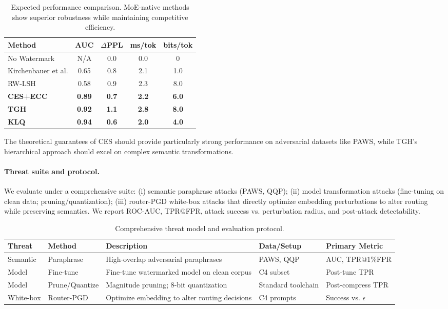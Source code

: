 \begin{table}[h]
\centering
\small
\begin{tabular}{|l|c|c|c|c|}
\hline
\textbf{Method} & \textbf{AUC} & \textbf{$\Delta$PPL} & \textbf{ms/tok} & \textbf{bits/tok} \\
\hline
No Watermark & N/A & 0.0 & 0.0 & 0 \\
Kirchenbauer et al. & 0.65 & 0.8 & 2.1 & 1.0 \\
RW-LSH & 0.58 & 0.9 & 2.3 & 8.0 \\
\textbf{CES+ECC} & \textbf{0.89} & \textbf{0.7} & \textbf{2.2} & \textbf{6.0} \\
\textbf{TGH} & \textbf{0.92} & \textbf{1.1} & \textbf{2.8} & \textbf{8.0} \\
\textbf{KLQ} & \textbf{0.94} & \textbf{0.6} & \textbf{2.0} & \textbf{4.0} \\
\hline
\end{tabular}
\caption{Expected performance comparison. MoE-native methods show superior robustness while maintaining competitive efficiency.}
\end{table}

The theoretical guarantees of CES should provide particularly strong performance on adversarial datasets like PAWS, while TGH's hierarchical approach should excel on complex semantic transformations.

\paragraph{Threat suite and protocol.} We evaluate under a comprehensive suite: (i) semantic paraphrase attacks (PAWS, QQP); (ii) model transformation attacks (fine-tuning on clean data; pruning/quantization); (iii) router-PGD white-box attacks that directly optimize embedding perturbations to alter routing while preserving semantics. We report ROC-AUC, TPR@FPR, attack success vs. perturbation radius, and post-attack detectability.

\begin{table*}[t]
\centering
\small
\begin{tabular}{|l|l|p{4.5cm}|l|l|}
\hline
\textbf{Threat} & \textbf{Method} & \textbf{Description} & \textbf{Data/Setup} & \textbf{Primary Metric} \\
\hline
Semantic & Paraphrase & High-overlap adversarial paraphrases & PAWS, QQP & AUC, TPR@1\%FPR \\
Model & Fine-tune & Fine-tune watermarked model on clean corpus & C4 subset & Post-tune TPR \\
Model & Prune/Quantize & Magnitude pruning; 8-bit quantization & Standard toolchain & Post-compress TPR \\
White-box & Router-PGD & Optimize embedding to alter routing decisions & C4 prompts & Success vs. $\epsilon$ \\
\hline
\end{tabular}
\caption{Comprehensive threat model and evaluation protocol.}
\label{tab:threats}
\end{table*}

